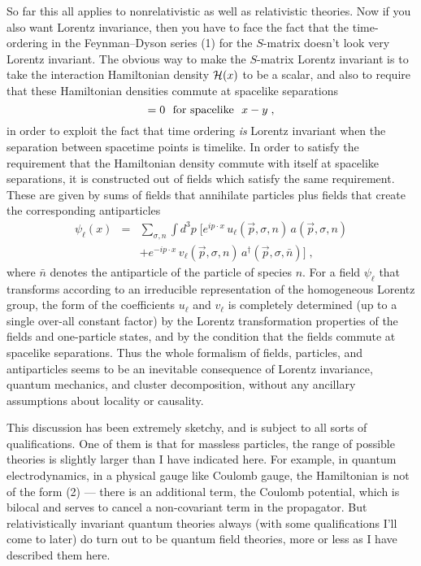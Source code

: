 So far this all applies to nonrelativistic as well as
relativistic theories.  Now if you also want
Lorentz invariance, then you have to face the fact that the
time-ordering in the Feynman--Dyson series (1) for the
$S$-matrix doesn't look very Lorentz invariant.  The obvious
way
to make the $S$-matrix Lorentz invariant is to take the
interaction Hamiltonian density ${\cal H}(x)$ to be a
scalar, and also to require that these Hamiltonian densities
commute at spacelike separations
\begin{equation}
[{\cal H}(x),{\cal H}(y)]=0~~{\rm for~spacelike}~~x-y\;,
\end{equation}
in order to exploit the fact that time ordering {\em is}
Lorentz invariant when the separation between spacetime
points is timelike.  In order to satisfy the requirement
that the Hamiltonian density commute with itself at
spacelike separations, it is constructed out of fields which
satisfy the same requirement.  These are given by sums of
fields that annihilate particles plus fields that create the
corresponding antiparticles
\begin{eqnarray}
\psi_\ell(x)&=&\sum_{\sigma,n}\int d^3p\;\Bigg[
e^{ip\cdot x}\,u_\ell({\vec p},\sigma,n)\,a({\vec
p},\sigma,n)\nonumber\\&&+e^{-ip\cdot x}\,v_\ell({\vec
p},\sigma,n)\,a^\dagger({\vec p},\sigma,\bar{n})\Bigg]\;,
\end{eqnarray}
where $\bar{n}$ denotes the antiparticle of the particle of
species $n$.
For a field $\psi_\ell$ that transforms according to an
irreducible representation of the homogeneous Lorentz group,
the form of the coefficients $u_\ell$ and $v_\ell$
is completely determined (up to a single over-all constant
factor) by the Lorentz transformation properties of the
fields and one-particle states, and by the condition that
the fields commute at spacelike separations.
Thus the whole formalism of fields, particles, and
antiparticles seems to be an inevitable consequence of
Lorentz invariance, quantum mechanics, and cluster
decomposition, without any ancillary assumptions about
locality or causality.

This discussion has been extremely sketchy, and is subject
to all sorts of qualifications.  One of them is that for
massless particles, the range of possible theories is
slightly larger than I have indicated here.  For example, in
quantum electrodynamics, in a physical gauge like Coulomb
gauge, the Hamiltonian is not of the form (2) --- there is
an additional term, the Coulomb potential, which is  bilocal
and serves to cancel a non-covariant term in the propagator.
But relativistically invariant quantum theories always (with
some qualifications I'll come to later) do turn out to be
quantum field theories, more or less as I have described
them here.

